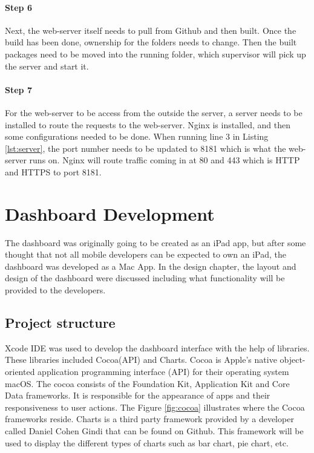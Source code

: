 \paragraph{Step 6}
Next, the web-server itself needs to pull from Github and then built. Once the build has been done, ownership for the folders needs to change. Then the built packages need to be moved into the running folder, which supervisor will pick up the server and start it.


\paragraph{Step 7}
For the web-server to be access from the outside the server, a server needs to be installed to route the requests to the web-server. Nginx is installed, and then some configurations needed to be done. When running line 3 in Listing \ref{lst:server}, the port number needs to be updated to 8181 which is what the web-server runs on. Nginx will route traffic coming in at 80 and 443 which is HTTP and HTTPS to port 8181.


\section{Dashboard Development}

The dashboard was originally going to be created as an iPad app, but after some thought that not all mobile developers can be expected to own an iPad, the dashboard was developed as a Mac App. In the design chapter, the layout and design of the dashboard were discussed including what functionality will be provided to the developers.

\subsection{Project structure}

Xcode IDE was used to develop the dashboard interface with the help of libraries. These libraries included Cocoa(API) and Charts. Cocoa is Apple’s native object-oriented application programming interface (API) for their operating system macOS. The cocoa consists of the Foundation Kit, Application Kit and Core Data frameworks. It is responsible for the appearance of apps and their responsiveness to user actions. The Figure \ref{fig:cocoa} illustrates where the Cocoa frameworks reside. Charts is a third party framework provided by a developer called Daniel Cohen Gindi that can be found on Github. \cite{charts} This framework will be used to display the different types of charts such as bar chart, pie chart, etc.

